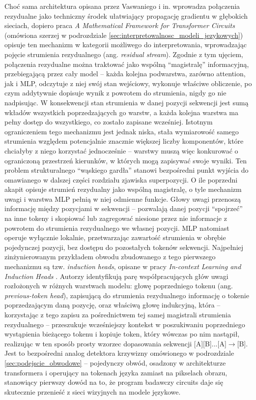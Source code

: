 \newline
Choć sama architektura opisana przez Vaswaniego i in. wprowadza połączenia rezydualne jako techniczny środek ułatwiający propagację gradientu w głębokich sieciach, dopiero praca \textit{A Mathematical Framework for Transformer Circuits} \cite{elhage_2021_mathematical_framework_transformer_circuits} (omówiona szerzej w podrozdziale \ref{sec:interpretowalnosc_modeli_jezykowych}) opisuje ten mechanizm w kategorii możliwego do interpretowania, wprowadzając pojęcie strumienia rezydualnego (ang. \textit{residual stream}). Zgodnie z tym ujęciem, połączenia rezydualne można traktować jako wspólną \enquote{magistralę} informacyjną, przebiegającą przez cały model -- każda kolejna podwarstwa, zarówno attention, jak i MLP, odczytuje z niej swój stan wejściowy, wykonuje właściwe obliczenie, po czym addytywnie dopisuje wynik z powrotem do strumienia, nigdy go nie nadpisując. W konsekwencji stan strumienia w danej pozycji sekwencji jest sumą wkładów wszystkich poprzedzających go warstw, a każda kolejna warstwa ma pełny dostęp do wszystkiego, co zostało zapisane wcześniej. Istotnym ograniczeniem tego mechanizmu jest jednak niska, stała wymiarowość samego strumienia względem potencjalnie znacznie większej liczby komponentów, które chciałyby z niego korzystać jednocześnie -- warstwy muszą więc konkurować o ograniczoną przestrzeń kierunków, w których mogą zapisywać swoje wyniki. Ten problem strukturalnego \enquote{wąskiego gardła} stanowi bezpośredni punkt wyjścia do omawianego w dalszej części rozdziału zjawiska superpozycji. \newline
O ile poprzedni akapit opisuje strumień rezydualny jako wspólną magistralę, o tyle mechanizm uwagi i warstwa MLP pełnią w niej odmienne funkcje. Głowy uwagi przenoszą informację między pozycjami w sekwencji -- pozwalają danej pozycji \enquote{spojrzeć} na inne tokeny i skopiować lub zagregować niesione przez nie informacje z powrotem do strumienia rezydualnego we własnej pozycji. MLP natomiast operuje wyłącznie lokalnie, przetwarzając zawartość strumienia w obrębie pojedynczej pozycji, bez dostępu do pozostałych tokenów sekwencji. Najpełniej zinżynierowanym przykładem obwodu zbudowanego z tego pierwszego mechanizmu są tzw. \textit{induction heads}, opisane w pracy \textit{In-context Learning and Induction Heads} \cite{olsson_2022_induction_heads}. Autorzy identyfikują parę współpracujących głów uwagi rozłożonych w różnych warstwach modelu: głowę poprzedniego tokenu (ang. \textit{previous-token head}), zapisującą do strumienia rezydualnego informację o tokenie poprzedzającym daną pozycję, oraz właściwą głowę indukcyjną, która -- korzystając z tego zapisu za pośrednictwem tej samej magistrali strumienia rezydualnego -- przeszukuje wcześniejszy kontekst w poszukiwaniu poprzedniego wystąpienia bieżącego tokenu i kopiuje token, który wówczas po nim nastąpił, realizując w ten sposób prosty wzorzec dopasowania sekwencji [A][B]...[A]$\rightarrow$[B]. Jest to bezpośredni analog detektora krzywizny omówionego w podrozdziale \ref{sec:podejscie_obwodowe} -- pojedynczy obwód, osadzony w architekturze transformera i operujący na tokenach języka zamiast na pikselach obrazu, stanowiący pierwszy dowód na to, że program badawczy circuits daje się skutecznie przenieść z sieci wizyjnych na modele językowe. 
